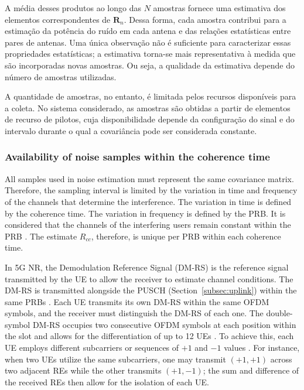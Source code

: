 A média desses produtos ao longo das $N$ amostras fornece uma estimativa dos elementos correspondentes de $\mathbf R_n$. Dessa forma, cada amostra contribui para a estimação da potência do ruído em cada antena e das relações estatísticas entre pares de antenas. Uma única observação não é suficiente para caracterizar essas propriedades estatísticas; a estimativa torna-se mais representativa à medida que são incorporadas novas amostras. Ou seja, a qualidade da estimativa depende do número de amostras utilizadas.

A quantidade de amostras, no entanto, é limitada pelos recursos disponíveis para a coleta. No sistema considerado, as amostras são obtidas a partir de elementos de recurso de pilotos, cuja disponibilidade depende da configuração do sinal e do intervalo durante o qual a covariância pode ser considerada constante.


\subsubsection{Availability of noise samples within the coherence time}\label{subsubsec:disponibilidade-amostras}
All samples used in noise estimation must represent the same covariance matrix. Therefore, the sampling interval is limited by the variation in time and frequency of the channels that determine the interference. The variation in time is defined by the coherence time. The variation in frequency is defined by the PRB. It is considered that the channels of the interfering users remain constant within the PRB \cite{zhao2025jsac}. The estimate $R_{cc}$, therefore, is unique per PRB within each coherence time.


In 5G NR, the Demodulation Reference Signal (DM-RS) is the reference signal transmitted by the UE to allow the receiver to estimate channel conditions. The DM-RS is transmitted alongside the PUSCH (Section~\ref{subsec:uplink}) within the same PRBs \cite[Sec.~6.4.1.1.3]{3gpp-ts38211}. Each UE transmits its own DM-RS within the same OFDM symbols, and the receiver must distinguish the DM-RS of each one. The double-symbol DM-RS occupies two consecutive OFDM symbols at each position within the slot and allows for the differentiation of up to 12 UEs \cite[Tab.~6.4.1.1.3-5]{3gpp-ts38211}. To achieve this, each UE employs different subcarriers or sequences of $+1$ and $-1$ values \cite[Tab.~6.4.1.1.3-2]{3gpp-ts38211}. For instance, when two UEs utilize the same subcarriers, one may transmit $(+1, +1)$ across two adjacent REs while the other transmits $(+1, -1)$; the sum and difference of the received REs then allow for the isolation of each UE.

